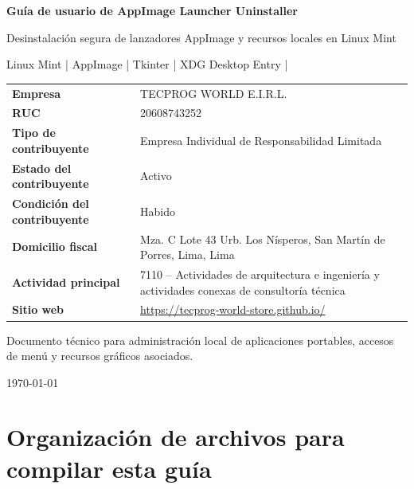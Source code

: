 \documentclass[11pt,a4paper]{article}
\begin{document}
\begin{titlepage}
    \centering
    \vspace*{1.2cm}

    {\Huge\bfseries\color{tecdark} Guía de usuario de AppImage Launcher Uninstaller\par}

    \vspace{0.5cm}
    {\Large Desinstalación segura de lanzadores AppImage y recursos locales en Linux Mint\par}

    \vspace{1.0cm}
    {\large Linux Mint \quad | \quad AppImage \quad | \quad Tkinter \quad | \quad XDG Desktop Entry \quad | \par}

    \vfill

    \begin{tabular}{>{\bfseries}p{5.0cm}p{9.5cm}}
        Empresa & TECPROG WORLD E.I.R.L. \\
        RUC & 20608743252 \\
        Tipo de contribuyente & Empresa Individual de Responsabilidad Limitada \\
        Estado del contribuyente & Activo \\
        Condición del contribuyente & Habido \\
        Domicilio fiscal & Mza. C Lote 43 Urb. Los Nísperos, San Martín de Porres, Lima, Lima \\
        Actividad principal & 7110 -- Actividades de arquitectura e ingeniería y actividades conexas de consultoría técnica \\
        Sitio web & \url{https://tecprog-world-store.github.io/} \\
    \end{tabular}

    \vfill
    {\large Documento técnico para administración local de aplicaciones portables, accesos de menú y recursos gráficos asociados.\par}

    \vspace{0.8cm}
    {\large \today\par}
\end{titlepage}

\tableofcontents
\newpage

\section{Organización de archivos para compilar esta guía}
\end{document}
